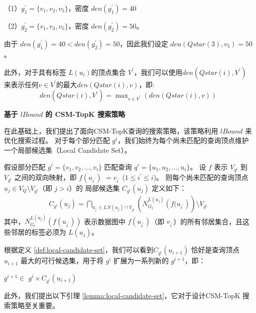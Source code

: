      （1）$g_1^\prime=\{v_1, v_2, v_5\}$，密度 $den(g_1^\prime) = 40$

     （2）$g_2^\prime=\{v_1, v_3, v_5\}$，密度 $den(g_2^\prime) = 50$。

由于 $den(g_1^\prime)= 40 < den(g_2^\prime)=50$，因此我们设定 $den(Qstar(3), v_5) = 50$。

此外，对于具有标签 $L(u_i)$的顶点集合 $V^\prime$，我们可以使用$den(Qstar(i), V^\prime)$来表示任何$v\in V^\prime$的最大$den(Qstar(i), v)$，即:
\begin{equation}\label{equation:den-qstar-v}
	den(Qstar(i), V^\prime) = \max\nolimits_{v\in V^\prime}\left(den(Qstar(i), v)\right)
\end{equation}


\textbf{基于 $lBound$ 的 CSM-TopK 搜索策略}

在此基础上，我们提出了面向CSM-TopK查询的搜索策略，该策略利用 $lBound$ 来优化搜索过程。
对于每个部分匹配 $g^i$，我们始终为每个尚未匹配的查询顶点维护一个局部候选集（Local Candidate Set）。


\begin{definition} [局部候选集] \label{def:local-candidate-set}
    假设部分匹配 $g^i=\{v_1, v_2, \dots, v_i\}$ 匹配查询 $q^i=\{u_1, u_2, \dots, u_i\}$。
    设 $f$ 表示  $V_{q^i}$  到 $V_{g^i}$ 之间的双向映射，即 $f(u_{i^\prime})$ $=v_{i^\prime}$ ($1\leq i^\prime\leq i$)。
    则每个尚未匹配的查询顶点 $u_j \in V_Q\setminus V_{q^i}$（即 $j>i$）的 局部候选集 $C_{g^i}(u_j)$ 定义如下：
    \begin{equation} \label{equation:local-candidate-set}
    \begin{multlined}
    C_{g^i}(u_j) = \bigcap\nolimits_{u_{i^\prime}\in LN(u_j)\cap V_{q^i}} \left(N_{G_t}^{L(u_j)}\left(f(u_{i^\prime}\right)\right) \setminus V_{g^i}
    \end{multlined}
    \end{equation}
    其中，$N_{G_t}^{L(u_j)}(f(u_{i^\prime}))$ 表示数据图中 $f(u_{i^\prime})$（即 $v_{i^\prime}$）的所有邻居集合，且这些邻居的标签必须为 $L(u_j)$。
\end{definition}


根据定义 \ref{def:local-candidate-set}，我们可以看到$C_{g^i}(u_{i+1})$ 恰好是查询顶点 $u_{i+1}$ 最大的可行候选集，用于将 $g^i$ 扩展为一系列新的 $g^{i+1}$，即：

$g^{i+1}\in$ $g^i\times C_{g^i}(u_{i+1})$

此外，我们提出以下引理 \ref{lemma:local-candidate-set}，它对于设计CSM-TopK 搜索策略至关重要。

